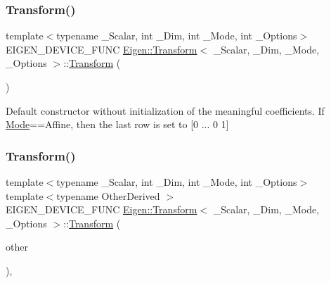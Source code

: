\subsubsection{\texorpdfstring{Transform()}{Transform()}\hspace{0.1cm}{\footnotesize\ttfamily [1/3]}}
{\footnotesize\ttfamily template$<$typename \+\_\+\+Scalar, int \+\_\+\+Dim, int \+\_\+\+Mode, int \+\_\+\+Options$>$ \\
E\+I\+G\+E\+N\+\_\+\+D\+E\+V\+I\+C\+E\+\_\+\+F\+U\+NC \mbox{\hyperlink{class_eigen_1_1_transform}{Eigen\+::\+Transform}}$<$ \+\_\+\+Scalar, \+\_\+\+Dim, \+\_\+\+Mode, \+\_\+\+Options $>$\+::\mbox{\hyperlink{class_eigen_1_1_transform}{Transform}} (\begin{DoxyParamCaption}{ }\end{DoxyParamCaption})\hspace{0.3cm}{\ttfamily [inline]}}

Default constructor without initialization of the meaningful coefficients. If \mbox{\hyperlink{struct_mode}{Mode}}==Affine, then the last row is set to \mbox{[}0 ... 0 1\mbox{]} \mbox{\label{class_eigen_1_1_transform_a5ee8b0067f6dadc04684be504e11a0c3}} 
\subsubsection{\texorpdfstring{Transform()}{Transform()}\hspace{0.1cm}{\footnotesize\ttfamily [2/3]}}
{\footnotesize\ttfamily template$<$typename \+\_\+\+Scalar, int \+\_\+\+Dim, int \+\_\+\+Mode, int \+\_\+\+Options$>$ \\
template$<$typename Other\+Derived $>$ \\
E\+I\+G\+E\+N\+\_\+\+D\+E\+V\+I\+C\+E\+\_\+\+F\+U\+NC \mbox{\hyperlink{class_eigen_1_1_transform}{Eigen\+::\+Transform}}$<$ \+\_\+\+Scalar, \+\_\+\+Dim, \+\_\+\+Mode, \+\_\+\+Options $>$\+::\mbox{\hyperlink{class_eigen_1_1_transform}{Transform}} (\begin{DoxyParamCaption}\item[{const \mbox{\hyperlink{struct_eigen_1_1_eigen_base}{Eigen\+Base}}$<$ Other\+Derived $>$ \&}]{other }\end{DoxyParamCaption})\hspace{0.3cm}{\ttfamily [inline]}, {\ttfamily [explicit]}}

